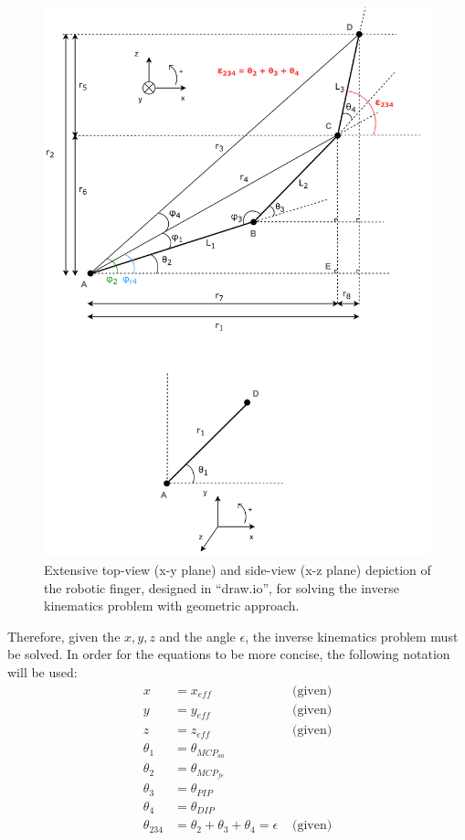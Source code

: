 \documentclass[a4paper,12pt]{article}
\begin{document}
\begin{figure}[htbp]
    \centering
    \includegraphics[width=1\textwidth]{img/finger_diagram_all.png}
    \caption{Extensive top-view (x-y plane) and side-view (x-z plane) depiction of the robotic finger, designed in ``draw.io'', for solving the inverse kinematics problem with geometric approach.}
    \label{fig:finger_all_inverse}
\end{figure}

Therefore, given the $x, y, z$ and the angle $\epsilon$, the inverse kinematics problem must be solved. In order for the equations to be more concise, the following notation will be used:\\
\begin{equation}
\label{eq:given}
\begin{aligned}
    x & = x_{eff} &\text{ (given)}\\
    y & = y_{eff} &\text{ (given)}\\
    z & = z_{eff} &\text{ (given)}\\
    \theta_{1} & = \theta_{MCP_{aa}}\\
    \theta_{2} & = \theta_{MCP_{fe}}\\
    \theta_{3} & = \theta_{PIP}\\
    \theta_{4} & = \theta_{DIP}\\
    \theta_{234} & = \theta_{2} + \theta_{3} + \theta_{4} = \epsilon &\text{ (given)}
\end{aligned}
\end{equation}
\end{document}

